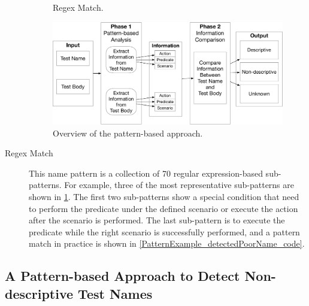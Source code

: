 \documentclass[proposal.tex]{subfiles}
\begin{document}
\begin{description}
\begin{figure}[t]
\centering
    \begin{subfigure}{0.675\textwidth}
    \end{subfigure}
\caption{Regex Match.}
\label{fig:regex-match}
\end{figure}

\begin{figure}[t]
  \centering
  \includegraphics[scale=0.25]{figures/overview_of_approach.pdf}
  \caption{Overview of the pattern-based approach.}
  \label{fig:approach}
\end{figure}

\item[Regex Match]

This name pattern is a collection of \num{70} regular expression-based sub-patterns.
%
For example, three of the most representative sub-patterns are shown in \cref{fig:regex-match}.
%
The first two sub-patterns show a special condition that need to perform the predicate under the defined scenario or execute the action after the scenario is performed.
%
The last sub-pattern is to execute the predicate while the right scenario is successfully performed, and a pattern match in practice is shown in \cref{PatternExample_detectedPoorName_code}.

\end{description}


\subsection{A Pattern-based Approach to Detect Non-descriptive Test Names}

\label{sec:approach}
\end{document}

